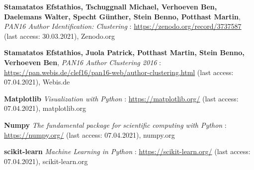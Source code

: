 \begin{thebibliography}{9}
\textbf{Stamatatos Efstathios, Tschuggnall Michael, Verhoeven Ben, Daelemans Walter, Specht Günther, Stein Benno, Potthast Martin},
\textit{PAN16 Author Identification: Clustering} : \url{https://zenodo.org/record/3737587} (last access: 30.03.2021),
Zenodo.org

\textbf{Stamatatos Efstathios, Juola Patrick, Potthast Martin, Stein Benno, Verhoeven Ben},
\textit{PAN16 Author Clustering 2016} : \url{https://pan.webis.de/clef16/pan16-web/author-clustering.html} (last access: 07.04.2021),
Webis.de


\textbf{Matplotlib}
\textit{Visualization with Python} : \url{https://matplotlib.org/} (last access: 07.04.2021),
matplotlib.org

\textbf{Numpy}
\textit{The fundamental package for scientific computing with Python} : \url{https://numpy.org/} (last access: 07.04.2021),
numpy.org

\textbf{scikit-learn}
\textit{Machine Learning in Python} : \url{https://scikit-learn.org/} (last access: 07.04.2021),
scikit-learn.org


\end{thebibliography}
